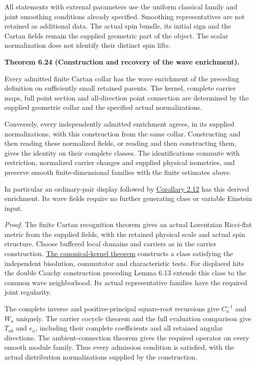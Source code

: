 \documentclass[
  english,
  11pt,
  reqno]{amsart}
\makeatletter
\newcommand{\pandocstatementheading}[1]{%
  \par\if@nobreak\else
    \addpenalty{\@beginparpenalty}%
    \addvspace{.5\baselineskip plus .2\baselineskip minus .2\baselineskip}%
  \fi
  {\normalfont\bfseries #1\par}%
  \nobreak\@afterindenttrue\@afterheading
}
\makeatother
\begin{document}
All statements with external parameters use the uniform classical family
and joint smoothing conditions already specified. Smoothing
representatives are not retained as additional data. The actual spin
bundle, its initial sign and the Cartan fields remain the supplied
geometric part of the object. The scalar normalization does not identify
their distinct spin lifts.

\pandocstatementheading{\leavevmode{}\label{thm:online-wave-enrichment-recognition}Theorem 6.24 (Construction and recovery of the wave enrichment).}

Every admitted finite Cartan collar has the wave enrichment of the
preceding definition on sufficiently small retained parents. The kernel,
complete carrier maps, full point section and all-direction point
connection are determined by the supplied geometric collar and the
specified actual normalizations.

Conversely, every independently admitted enrichment agrees, in its
supplied normalizations, with this construction from the same collar.
Constructing and then reading these normalized fields, or reading and
then constructing them, gives the identity on their complete classes.
The identifications commute with restriction, normalized carrier changes
and supplied physical isometries, and preserve smooth finite-dimensional
families with the finite estimates above.

In particular an ordinary-pair display followed by
\hyperref[cor:online-ordinary-pair-cartan-collar]{Corollary 2.12} has
this derived enrichment. Its wave fields require no further generating
class or variable Einstein input.

\emph{Proof.} The finite Cartan recognition theorem gives an actual
Lorentzian Ricci-flat metric from the supplied fields, with the retained
physical scale and actual spin structure. Choose buffered local domains
and carriers as in the carrier construction.
\hyperref[thm:online-canonical-wave-kernel]{The canonical-kernel
theorem} constructs a class satisfying the independent bisolution,
commutator and characteristic tests. For displaced hits the double
Cauchy construction preceding Lemma 6.13 extends this class to the
common wave neighborhood. Its actual representative families have the
required joint regularity.

The complete inverse and positive-principal square-root recursions give
\(C_a^{-1}\) and \(W_a\) uniquely. The carrier cocycle theorem and the
full evaluation comparison give \(T_{ab}\) and \(e_a\), including their
complete coefficients and all retained angular directions. The
ambient-connection theorem gives the required operator on every smooth
module family. Thus every admission condition is satisfied, with the
actual distribution normalizations supplied by the construction.
\end{document}
